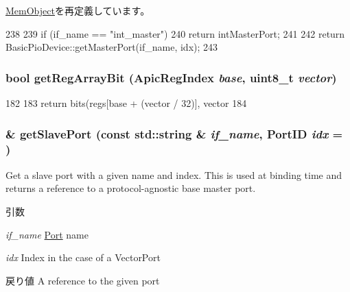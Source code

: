 \hyperlink{classMemObject_adc4e675e51defbdd1e354dac729d0703}{MemObject}を再定義しています。


\begin{DoxyCode}
238     {
239         if (if_name == "int_master") {
240             return intMasterPort;
241         }
242         return BasicPioDevice::getMasterPort(if_name, idx);
243     }
\end{DoxyCode}
\hypertarget{classX86ISA_1_1Interrupts_ae3b47da5f3237bda2aa53f8ae3399040}{
\subsubsection[{getRegArrayBit}]{\setlength{\rightskip}{0pt plus 5cm}bool getRegArrayBit ({\bf ApicRegIndex} {\em base}, \/  uint8\_\-t {\em vector})}}
\label{classX86ISA_1_1Interrupts_ae3b47da5f3237bda2aa53f8ae3399040}



\begin{DoxyCode}
182     {
183         return bits(regs[base + (vector / 32)], vector %
184     }
\end{DoxyCode}
\hypertarget{classX86ISA_1_1Interrupts_a5b5b45105eb4b64567ecea56e5bc30f2}{
\subsubsection[{getSlavePort}]{\& getSlavePort (const std::string \& {\em if\_\-name}, \/  {\bf PortID} {\em idx} = {})}}
\label{classX86ISA_1_1Interrupts_a5b5b45105eb4b64567ecea56e5bc30f2}
Get a slave port with a given name and index. This is used at binding time and returns a reference to a protocol-\/agnostic base master port.


\begin{DoxyParams}{引数}
\item[{\em if\_\-name}]\hyperlink{classPort}{Port} name \item[{\em idx}]Index in the case of a VectorPort\end{DoxyParams}
\begin{DoxyReturn}{戻り値}
A reference to the given port 
\end{DoxyReturn}



